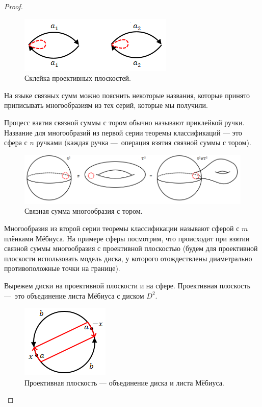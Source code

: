 \begin{proof}
    \begin{figure}[ht]
        \centering
        \includegraphics[scale=0.7]{images/c11.6.png}
        \caption{Склейка проективных плоскостей.}
        \label{fig:c11.6}
    \end{figure}

    На языке связных сумм можно пояснить некоторые названия, которые принято приписывать многообразиям из тех серий, которые мы получили.

    Процесс взятия связной суммы с тором обычно называют приклейкой ручки. Название для многообразий из первой серии теоремы классификаций — это сфера с $n$ ручками (каждая ручка — операция взятия связной суммы с тором).

    \begin{figure}[ht]
        \centering
        \includegraphics[scale=0.5]{images/c11.7.png}
        \caption{Связная сумма многообразия с тором.}
        \label{fig:c11.7}
    \end{figure}

    Многообразия из второй серии теоремы классификации называют сферой с $m$ плёнками Мёбиуса. На примере сферы посмотрим, что происходит при взятии связной суммы многообразия с проективной плоскостью (будем для проективной плоскости использовать модель диска, у которого отождествлены диаметрально противоположные точки на границе).

    Вырежем диски на проективной плоскости и на сфере. Проективная плоскость — это объединение листа Мёбиуса с диском $D^2$.

    \begin{figure}[htbp]
        \centering
        \includegraphics[scale=0.7]{images/c11.8.png}
        \caption{Проективная плоскость — объединение диска и листа Мёбиуса.}
        \label{fig:c11.8}
    \end{figure}


\end{proof}
